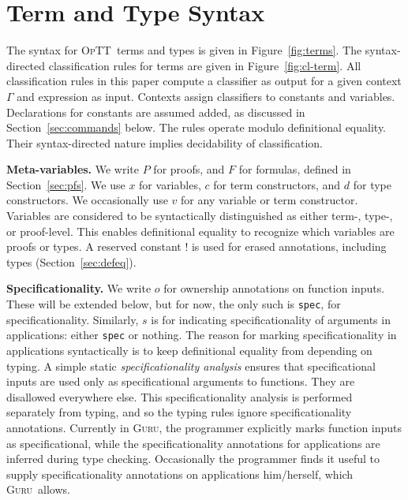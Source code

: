 \documentclass[9pt,natbib]{sigplanconf}
\newcommand{\optt}{\textsc{OpTT}}
\newcommand{\bang}[0]{\texttt{!}}
\newcommand{\guru}[0]{\textsc{Guru}}
\begin{document}
\section{Term and Type Syntax}
\label{sec:terms}

The syntax for \optt\ terms and types is given in
Figure~\ref{fig:terms}.  The syntax-directed classification rules for
terms are given in Figure~\ref{fig:cl-term}.  All classification rules
in this paper compute a classifier as output for a given context
$\Gamma$ and expression as input.  Contexts assign classifiers to
constants and variables.  Declarations for constants are assumed
added, as discussed in Section~\ref{sec:commands} below.  The rules
operate modulo definitional equality.  Their syntax-directed nature
implies decidability of classification.

\textbf{Meta-variables.} We write $P$ for
proofs, and $F$ for formulas, defined in Section~\ref{sec:pfs}.  We
use $x$ for variables, $c$ for term constructors, and $d$ for type
constructors.  We occasionally use $v$ for any variable or term
constructor.  Variables are considered to be syntactically
distinguished as either term-, type-, or proof-level.  This enables
definitional equality to recognize which variables are proofs or
types.  A reserved constant $\bang$ is used for erased annotations,
including types (Section~\ref{sec:defeq}).  

\textbf{Specificationality.} We write $o$ for ownership annotations on
function inputs.  These will be extended below, but for now, the only
such is \texttt{spec}, for specificationality.  Similarly, $s$ is for
indicating specificationality of arguments in applications: either
\texttt{spec} or nothing.  The reason for marking specificationality
in applications syntactically is to keep definitional equality from
depending on typing.  A simple static \emph{specificationality
analysis} ensures that specificational inputs are used only as
specificational arguments to functions.  They are disallowed
everywhere else.  This specificationality analysis is performed
separately from typing, and so the typing rules ignore
specificationality annotations.  Currently in \guru, the programmer
explicitly marks function inputs as specificational, while the
specificationality annotations for applications are inferred during
type checking.  Occasionally the programmer finds it useful to supply
specificationality annotations on applications him/herself, which
\guru\ allows.
\end{document}
